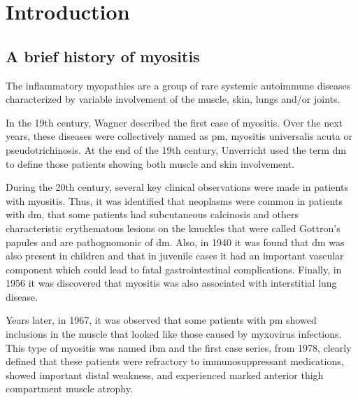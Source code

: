 \chapter{Introduction}

\section{A brief history of myositis}

The inflammatory myopathies are a group of rare systemic autoimmune diseases characterized by variable involvement of the muscle, skin, lungs and/or joints.\cite{SelvaOCallaghan2018}

In the 19th century, Wagner described the first case of myositis.\cite{Wagner1863} Over the next years, these diseases were collectively named as \gls{pm}, myositis universalis acuta or pseudotrichinosis.\cite{Pottain1875,Hepp1887,Unverricht1887,Stertz1916,Kankeleit1916,Patjes1926,Hautveränderungen1930} At the end of the 19th century, Unverricht used the term \gls{dm} to define those patients showing both muscle and skin involvement.\cite{Unverricht1891}

During the 20th century, several key clinical observations were made in patients with myositis. Thus, it was identified that neoplasms were common in patients with \gls{dm}, that some patients had subcutaneous calcinosis and others characteristic erythematous lesions on the knuckles that were called Gottron’s papules and are pathognomonic of \gls{dm}.\cite{Stertz1916,Kankeleit1916,Patjes1926,Hautveränderungen1930} Also, in 1940 it was found that \gls{dm} was also present in children and that in juvenile cases it had an important vascular component which could lead to fatal gastrointestinal complications.\cite{Hecht1940} Finally, in 1956 it was discovered that myositis was also associated with interstitial lung disease.\cite{Mills1956}

Years later, in 1967, it was observed that some patients with \gls{pm} showed inclusions in the muscle that looked like those caused by myxovirus infections.\cite{Chou1967} This type of myositis was named \gls{ibm} and the first case series, from 1978, clearly defined that these patients were refractory to immunosuppressant medications, showed important distal weakness, and experienced marked anterior thigh compartment muscle atrophy.\cite{Carpenter1978}

